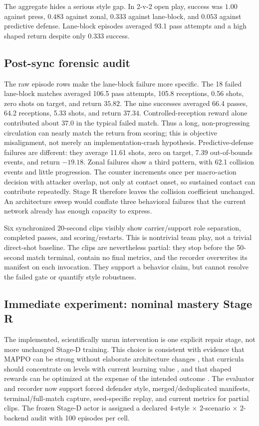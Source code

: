 \documentclass[12pt,twocolumn]{article}
\begin{document}
The aggregate hides a serious style gap. In 2-v-2 open play, success was $1.00$ against press,
$0.483$ against zonal, $0.333$ against lane-block, and $0.053$ against predictive defense.
Lane-block episodes averaged 93.1 pass attempts and a high shaped return despite only $0.333$
success.

\subsection{Post-sync forensic audit}
The raw episode rows make the lane-block failure more specific. The 18 failed lane-block matches
averaged 106.5 pass attempts, 105.8 receptions, 0.56 shots, zero shots on target, and return
$35.82$. The nine successes averaged 66.4 passes, 64.2 receptions, 5.33 shots, and return $37.34$.
Controlled-reception reward alone contributed about $37.0$ in the typical failed match. Thus a
long, non-progressing circulation can nearly match the return from scoring; this is objective
misalignment, not merely an implementation-crash hypothesis. Predictive-defense failures are
different: they average 11.61 shots, zero on target, 7.39 out-of-bounds events, and return
$-19.18$. Zonal failures show a third pattern, with 62.1 collision events and little progression.
The counter increments once per macro-action decision with attacker overlap, not only at contact
onset, so sustained contact can contribute repeatedly. Stage R therefore leaves the collision
coefficient unchanged. An architecture sweep would conflate three behavioral failures that the
current network already has enough capacity to express.

Six synchronized 20-second clips visibly show carrier/support role separation, completed passes,
and scoring/restarts. This is nontrivial team play, not a trivial direct-shot baseline. The clips
are nevertheless partial: they stop before the 50-second match terminal, contain no final metrics,
and the recorder overwrites its manifest on each invocation. They support a behavior claim, but
cannot resolve the failed gate or quantify style robustness.

\subsection{Immediate experiment: nominal mastery Stage R}
The implemented, scientifically unrun intervention is one explicit repair stage, not more
unchanged Stage-D training. This
choice is consistent with evidence that MAPPO can be strong without elaborate architecture
changes \cite{yu2022mappo}, that curricula should concentrate on levels with current learning
value \cite{jiang2021plr}, and that shaped rewards can be optimized at the expense of the intended
outcome \cite{forbes2025shaping}. The evaluator and recorder now support forced defender style,
merged/deduplicated manifests, terminal/full-match capture, seed-specific replay, and current
metrics for partial clips. The frozen Stage-D actor is assigned a declared $4$-style
$\times$ $2$-scenario
$\times$ $2$-backend audit with 100 episodes per cell.
\end{document}
